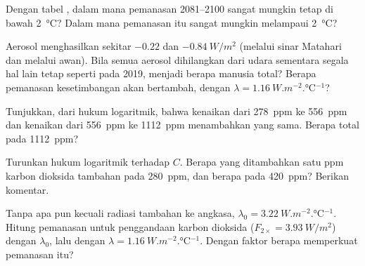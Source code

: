 \begin{exercise}[$\star\star$]\label{exo:g12:climate-change:11}
Dengan tabel , dalam  mana pemanasan 2081--2100 sangat mungkin
tetap di bawah \qty{2}{\degreeCelsius}? Dalam  mana pemanasan itu
sangat mungkin melampaui \qty{2}{\degreeCelsius}?
\end{exercise}

\begin{exercise}[$\star\star\star$]\label{exo:g12:climate-change:12}
Aerosol menghasilkan  sekitar $-0.22$ dan $\qty{-0.84}{W/m^2}$
(melalui sinar Matahari dan melalui awan). Bila semua aerosol dihilangkan dari
udara sementara segala hal lain tetap seperti pada 2019, menjadi berapa 
manusia total? Berapa pemanasan kesetimbangan akan bertambah, dengan
$\lambda = \qty{1.16}{W.m^{-2}.\degreeCelsius^{-1}}$?
\end{exercise}

\begin{exercise}[$\star\star\star$]\label{exo:g12:climate-change:13}
Tunjukkan, dari hukum logaritmik, bahwa kenaikan dari \qty{278}{ppm} ke
\qty{556}{ppm} dan kenaikan dari \qty{556}{ppm} ke \qty{1112}{ppm} menambahkan
 yang sama. Berapa  total pada \qty{1112}{ppm}?
\end{exercise}

\begin{exercise}[$\star\star\star$]\label{exo:g12:climate-change:14}
Turunkan hukum logaritmik terhadap $C$. Berapa  yang ditambahkan satu ppm
karbon dioksida tambahan pada \qty{280}{ppm}, dan berapa pada
\qty{420}{ppm}? Berikan komentar.
\end{exercise}

\begin{exercise}[$\star\star\star$]\label{exo:g12:climate-change:15}
Tanpa  apa pun kecuali radiasi tambahan ke angkasa,
$\lambda_0 = \qty{3.22}{W.m^{-2}.\degreeCelsius^{-1}}$. Hitung pemanasan
untuk penggandaan karbon dioksida ($F_{2\times} = \qty{3.93}{W/m^2}$) dengan
$\lambda_0$, lalu dengan $\lambda = \qty{1.16}{W.m^{-2}.\degreeCelsius^{-1}}$.
Dengan faktor berapa  memperkuat pemanasan itu?
\end{exercise}

